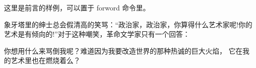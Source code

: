 \documentclass{WileySev}
\begin{document}

\dedication{感谢 Wiley 提供如此好的英文模板，基于此模板进行中文书籍模板制作，显得非常轻松与美观}








\contentsinbrief %
\tableofcontents


\begin{foreword}
这里是前言的样例，可以置于 forword 命令里。

象牙塔里的绅士总会假清高的笑骂：“政治家，政治家，你算得什么艺术家呢!你的艺术是有倾向的!”对于这种嘲笑，革命文学家只有一个回答：

你想用什么来骂倒我呢？难道因为我要改造世界的那种热诚的巨大火焰， 它在我的艺术里也在燃烧着么？

\end{foreword}
\end{document}
